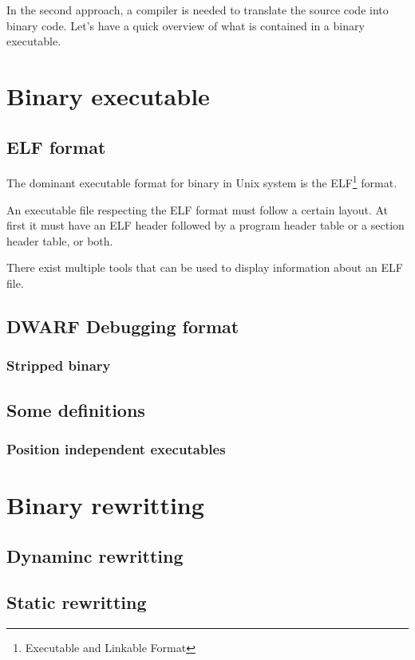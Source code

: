 \documentclass[a4paper,11pt,oneside]{report}
\begin{document}
In the second approach, a compiler is needed to translate the source code into binary code.
Let's have a quick overview of what is contained in a binary executable.


\section{Binary executable}
\subsection{ELF format}
The dominant executable format for binary in Unix system is the ELF\footnote{Executable
and Linkable Format} format. 

An executable file respecting the ELF format must follow a certain layout. At
first it must have an ELF header followed by a program header table or a section
header table, or both. 

There exist multiple tools that can be used to display information about an ELF file. 

\subsection{DWARF Debugging format}
\subsubsection{Stripped binary}

\subsection{Some definitions}
\subsubsection{Position independent executables}

\section{Binary rewritting}
\subsection{Dynaminc rewritting}
\subsection{Static rewritting}
\end{document}
